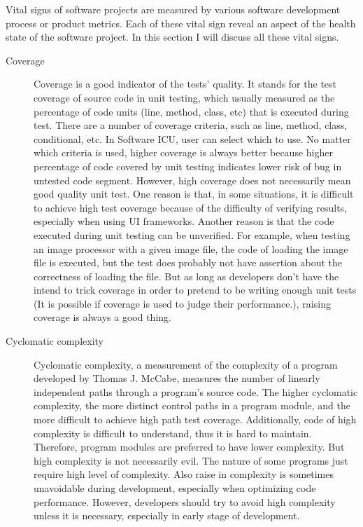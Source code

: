 Vital signs of software projects are measured by various software development process or product metrics. Each of these vital sign reveal an aspect of the health state of the software project. In this section I will discuss all these vital signs.
\begin{description}
\item[Coverage] 
Coverage is a good indicator of the tests' quality. It stands for the test coverage of source code in unit testing, which usually measured as the percentage of code units (line, method, class, etc) that is executed during test. There are a number of coverage criteria, such as line, method, class, conditional, etc. In Software ICU, user can select which to use. No matter which criteria is used, higher coverage is always better because higher percentage of code covered by unit testing indicates lower risk of bug in untested code segment. However, high coverage does not necessarily mean good quality unit test. One reason is that, in some situations, it is difficult to achieve high test coverage because of the difficulty of verifying results, especially when using UI frameworks. Another reason is that the code executed during unit testing can be unverified. For example, when testing an image processor with a given image file, the code of loading the image file is executed, but the test does probably not have assertion about the correctness of loading the file. But as long as developers don't have the intend to trick coverage in order to pretend to be writing enough unit tests (It is possible if coverage is used to judge their performance.), raising coverage is always a good thing.

\item[Cyclomatic complexity] 
Cyclomatic complexity, a measurement of the complexity of a program developed by Thomas J. McCabe, measures the number of linearly independent paths through a program's source code\cite{mccabe:complexity}. The higher cyclomatic complexity, the more distinct control paths in a program module, and the more difficult to achieve high path test coverage. Additionally, code of high complexity is difficult to understand, thus it is hard to maintain. Therefore, program modules are preferred to have lower complexity. But high complexity is not necessarily evil. The nature of some programs just require high level of complexity. Also raise in complexity is sometimes unavoidable during development, especially when optimizing code performance. However, developers should try to avoid high complexity unless it is necessary, especially in early stage of development.


\end{description}
